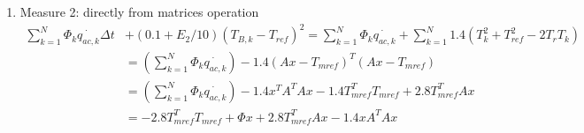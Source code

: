 \documentclass[titlepage,a4paper]{article}
\begin{document}
\begin{enumerate}
\begin{equation}
\begin{aligned}
\begin{array}{c@{\hspace{-5pt}}c}
\begin{array}{c|c}
\begin{matrix}
                                0 & \cdots & 0
                            \end{matrix} &
                            \begin{matrix}  
                                2.8 & \cdots & 0\\ 
                                \vdots & \ddots & \vdots \\
                                0 & \cdots & 2.8 
                            \end{matrix}
                        \end{array}
                    \right] &
                    \begin{array}{l}
                        \left.\vphantom{
                            \begin{array}{c} 
                                1 \\
                                \vdots \\
                                1 
                            \end{array}}
                            \right\}
                            N\\
                        \left.\vphantom{
                            \begin{array}{c} 
                                1 \\ 
                                \vdots \\
                                1 
                            \end{array}}
                            \right\}
                            N-1
                    \end{array}
                \end{array}
            \end{aligned}
        \end{equation}
        
        \item Measure 2: directly from matrices operation
        \begin{equation}
            \begin{aligned}
                \sum_{k=1}^N \Phi_k \dot{q_{ac,k}} \Delta t &+(0.1+E_2/10)(T_{B,k}-T_{ref})^2 = \sum_{k=1}^N \Phi_k \dot{q_{ac,k}}+\sum_{k=1}^N 1.4(T_k^2+T_{ref}^2-2T_r T_k) \\
                & =  (\sum_{k=1}^N \Phi_k \dot{q_{ac,k}}) -1.4(Ax-T_{mref})^T(Ax-T_{mref}) \\
                & = (\sum_{k=1}^N \Phi_k \dot{q_{ac,k}}) -1.4x^T A^T A x -1.4T_{mref}^T T_{mref} + 2.8 T_{mref}^T A x\\
                & = -2.8 T_{mref}^T T_{mref} + \Phi x  + 2.8 T_{mref}^T A x- 1.4 x A^T A x \\
            \end{aligned}
        \end{equation}


\end{enumerate}
\end{document}

